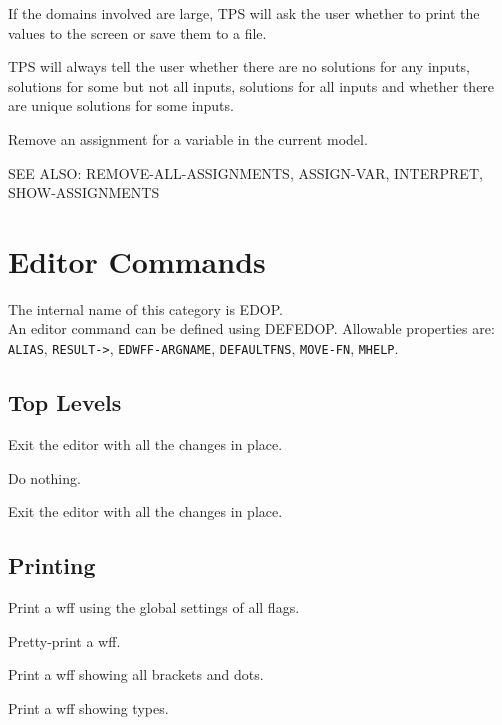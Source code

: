 \begin{description}
If the domains involved are large, TPS will ask the user whether to
print the values to the screen or save them to a file.

TPS will always tell the user whether there are no solutions for any
inputs, solutions for some but not all inputs, solutions for all
inputs and whether there are unique solutions for some inputs.

\item[UNASSIGN-VAR]  
Remove an assignment for a variable in the current model.

SEE ALSO: REMOVE-ALL-ASSIGNMENTS, ASSIGN-VAR, INTERPRET, SHOW-ASSIGNMENTS
\item
\end{description}
\chapter{Editor Commands}
The internal name of this category is 
EDOP.\\
An editor command can be defined using DEFEDOP.
Allowable properties are: \texttt{ALIAS}, \texttt{RESULT->}, \texttt{EDWFF-ARGNAME}, \texttt{DEFAULTFNS}, \texttt{MOVE-FN}, \texttt{MHELP}.

\section{Top Levels}

\begin{description} 
\item[LEAVE]  
Exit the editor with all the changes in place.

\item[NOOP]  
Do nothing.

\item[OK]  
Exit the editor with all the changes in place.
\item
\end{description}

\section{Printing}

\begin{description} 
\item[P]  
Print a wff using the global settings of all flags.

\item[PP]  
Pretty-print a wff.

\item[PS]  
Print a wff showing all brackets and dots.

\item[PT]  
Print a wff showing types.
\item
\end{description}

